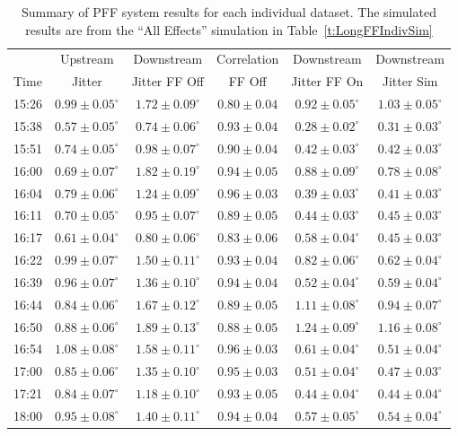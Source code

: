 \begin{table}
  \begin{center}
    \begin{tabular}{| c  c  c  c  c  c  |}
	   \hline
	           & Upstream  & Downstream & Correlation  & Downstream  & Downstream  \\
       Time & Jitter &  Jitter FF Off &  FF Off &  Jitter FF On &  Jitter Sim \\ \hline
15:26 & \(0.99\pm0.05^\circ\) & \(1.72\pm0.09^\circ\) & \(0.80\pm0.04\) & \(0.92\pm0.05^\circ\) & \(1.03\pm0.05^\circ\) \\
15:38 & \(0.57\pm0.05^\circ\) & \(0.74\pm0.06^\circ\) & \(0.93\pm0.04\) & \(0.28\pm0.02^\circ\) & \(0.31\pm0.03^\circ\) \\
15:51 & \(0.74\pm0.05^\circ\) & \(0.98\pm0.07^\circ\) & \(0.90\pm0.04\) & \(0.42\pm0.03^\circ\) & \(0.42\pm0.03^\circ\) \\
16:00 & \(0.69\pm0.07^\circ\) & \(1.82\pm0.19^\circ\) & \(0.94\pm0.05\) & \(0.88\pm0.09^\circ\) & \(0.78\pm0.08^\circ\) \\
16:04 & \(0.79\pm0.06^\circ\) & \(1.24\pm0.09^\circ\) & \(0.96\pm0.03\) & \(0.39\pm0.03^\circ\) & \(0.41\pm0.03^\circ\) \\
16:11 & \(0.70\pm0.05^\circ\) & \(0.95\pm0.07^\circ\) & \(0.89\pm0.05\) & \(0.44\pm0.03^\circ\) & \(0.45\pm0.03^\circ\) \\
16:17 & \(0.61\pm0.04^\circ\) & \(0.80\pm0.06^\circ\) & \(0.83\pm0.06\) & \(0.58\pm0.04^\circ\) & \(0.45\pm0.03^\circ\) \\
16:22 & \(0.99\pm0.07^\circ\) & \(1.50\pm0.11^\circ\) & \(0.93\pm0.04\) & \(0.82\pm0.06^\circ\) & \(0.62\pm0.04^\circ\) \\
16:39 & \(0.96\pm0.07^\circ\) & \(1.36\pm0.10^\circ\) & \(0.94\pm0.04\) & \(0.52\pm0.04^\circ\) & \(0.59\pm0.04^\circ\) \\
16:44 & \(0.84\pm0.06^\circ\) & \(1.67\pm0.12^\circ\) & \(0.89\pm0.05\) & \(1.11\pm0.08^\circ\) & \(0.94\pm0.07^\circ\) \\
16:50 & \(0.88\pm0.06^\circ\) & \(1.89\pm0.13^\circ\) & \(0.88\pm0.05\) & \(1.24\pm0.09^\circ\) & \(1.16\pm0.08^\circ\) \\
16:54 & \(1.08\pm0.08^\circ\) & \(1.58\pm0.11^\circ\) & \(0.96\pm0.03\) & \(0.61\pm0.04^\circ\) & \(0.51\pm0.04^\circ\) \\
17:00 & \(0.85\pm0.06^\circ\) & \(1.35\pm0.10^\circ\) & \(0.95\pm0.03\) & \(0.51\pm0.04^\circ\) & \(0.47\pm0.03^\circ\) \\
17:21 & \(0.84\pm0.07^\circ\) & \(1.18\pm0.10^\circ\) & \(0.93\pm0.05\) & \(0.44\pm0.04^\circ\) & \(0.44\pm0.04^\circ\) \\
18:00 & \(0.95\pm0.08^\circ\) & \(1.40\pm0.11^\circ\) & \(0.94\pm0.04\) & \(0.57\pm0.05^\circ\) & \(0.54\pm0.04^\circ\) \\ \hline
    \end{tabular}
    \caption{Summary of PFF system results for each individual dataset. The simulated results are from the ``All Effects'' simulation in Table~\ref{t:LongFFIndivSim}}
  	\label{t:LongFFIndiv}
  \end{center}
\end{table}

